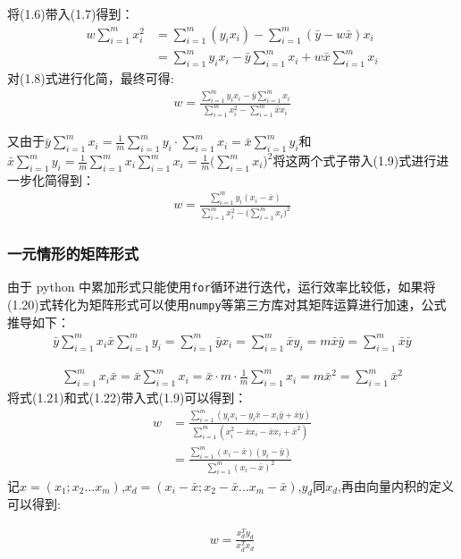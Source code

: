 \documentclass[cn,hazy,blue,14pt,normal]{elegantnote}
\begin{document}
将(1.6)带入(1.7)得到：
\begin{align}
  w\sum_{i=1}^m{x_i^2}&=\sum_{i=1}^m{(y_ix_i)-\sum_{i=1}^m(\bar{y}-w\bar{x})x_i}\nonumber \\ &=\sum_{i=1}^my_ix_i - \bar{y}\sum_{i=1}^mx_i+w\bar{x}\sum_{i=1}^mx_i
\end{align}
对(1.8)式进行化简，最终可得:
\begin{align}
  w = \frac{\sum_{i=1}^my_ix_i-\bar{y}\sum_{i=1}^mx_i}{\sum_{i=1}^mx_i^2-\sum_{i=1}^m\bar{x}x_i}
\end{align}

又由于$\bar{y}\sum_{i=1}^mx_i=\frac{1}{m}\sum_{i=1}^m{y_i}\cdot\sum_{i=1}^mx_i=\bar{x}\sum_{i=1}^my_i$和$\bar{x}\sum_{i=1}^my_i=\frac{1}{m}\sum_{i=1}^mx_i\sum_{i=1}^mx_i=\frac{1}{m}\Big(\sum_{i=1}^mx_i\Big)^2$将这两个式子带入(1.9)式进行进一步化简得到：
\begin{align}
  w=\frac{\sum_{i=1}^my_i(x_i-\bar{x})}{\sum_{i=1}^mx_i^2-\Big(\sum_{i=1}^mx_i\Big)^2}
\end{align}
\subsubsection{一元情形的矩阵形式}
由于 python 中累加形式只能使用\texttt{for}循环进行迭代，运行效率比较低，如果将(1.20)式转化为矩阵形式可以使用\texttt{numpy}等第三方库对其矩阵运算进行加速，公式推导如下：
\begin{align}
  \bar{y}\sum_{i=1}^mx_i\bar{x}\sum_{i=1}^my_i=\sum_{i=1}^m\bar{y}x_i=\sum_{i=1}^m\bar{x}y_i =m\bar{x}\bar{y}=\sum_{i=1}^m\bar{x}\bar{y}
\end{align}

\begin{align}
  \sum_{i=1}^mx_i\bar{x}=\bar{x}\sum_{i=1}^mx_i=\bar{x}\cdot m\cdot \frac{1}{m}\sum_{i=1}^mx_i=m\bar{x}^2=\sum_{i=1}^m\bar{x}^2
\end{align}
将式(1.21)和式(1.22)带入式(1.9)可以得到：
\begin{align}
  w&=\frac{\sum_{i=1}^m(y_ix_i-y_i\bar{x}-x_i\bar{y}+\bar{x}\bar{y})}{\sum_{i=1}^m(x_i^2-\bar{x}x_i-\bar{x}x_i+\bar{x}^2)} \nonumber\\&=\frac{\sum_{i=1}^m(x_i-\bar{x})(y_i-\bar{y})}{\sum_{i=1}^m(x_i-\bar{x})^2}
\end{align}
记$x=(x_1;x_2...x_m)$,$x_d=(x_i-\bar{x};x_2-\bar{x}...x_m-\bar{x})$,$y_d$同$x_d$,再由向量内积的定义可以得到:

\begin{align}
  w=\frac{x_d^Ty_d}{x_d^Tx_d}
\end{align}
\end{document}
